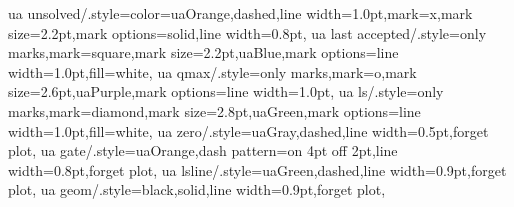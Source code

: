 {  %
  ua unsolved/.style={color=uaOrange,dashed,line width=1.0pt,mark=x,mark size=2.2pt,mark options={solid,line width=0.8pt}},
  ua last accepted/.style={only marks,mark=square,mark size=2.2pt,uaBlue,mark options={line width=1.0pt,fill=white}},
  ua qmax/.style={only marks,mark=o,mark size=2.6pt,uaPurple,mark options={line width=1.0pt}},
  ua ls/.style={only marks,mark=diamond,mark size=2.8pt,uaGreen,mark options={line width=1.0pt,fill=white}},
  ua zero/.style={uaGray,dashed,line width=0.5pt,forget plot},
  ua gate/.style={uaOrange,dash pattern=on 4pt off 2pt,line width=0.8pt,forget plot},
  ua lsline/.style={uaGreen,dashed,line width=0.9pt,forget plot},
  ua geom/.style={black,solid,line width=0.9pt,forget plot},
}
\newcommand\uaNote[1]{{\uaNoteFont #1}}
\newcommand\uaPage[4]{\pgfresetboundingbox\path (-#1,-#2) rectangle ($(\uaAxW,\uaAxH)+(#3,#4)$);}
